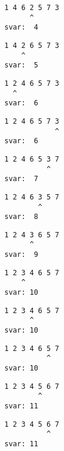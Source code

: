 { \begin{verbatim}
                1 4 6 2 5 7 3
                      ^
                svar:  4
\end{verbatim}}
{ \begin{verbatim}
                1 4 2 6 5 7 3
                    ^
                svar:  5
\end{verbatim}}
{ \begin{verbatim}
                1 2 4 6 5 7 3
                  ^
                svar:  6
\end{verbatim}}
{ \begin{verbatim}
                1 2 4 6 5 7 3
                            ^
                svar:  6
\end{verbatim}}
{ \begin{verbatim}
                1 2 4 6 5 3 7
                          ^
                svar:  7
\end{verbatim}}
{ \begin{verbatim}
                1 2 4 6 3 5 7
                        ^
                svar:  8
\end{verbatim}}
{ \begin{verbatim}
                1 2 4 3 6 5 7
                      ^
                svar:  9
\end{verbatim}}
{ \begin{verbatim}
                1 2 3 4 6 5 7
                    ^
                svar: 10
\end{verbatim}}
{ \begin{verbatim}
                1 2 3 4 6 5 7
                      ^
                svar: 10
\end{verbatim}}
{ \begin{verbatim}
                1 2 3 4 6 5 7
                          ^
                svar: 10
\end{verbatim}}
{ \begin{verbatim}
                1 2 3 4 5 6 7
                        ^
                svar: 11
\end{verbatim}}
{ \begin{verbatim}
                1 2 3 4 5 6 7
                          ^
                svar: 11
\end{verbatim}}
